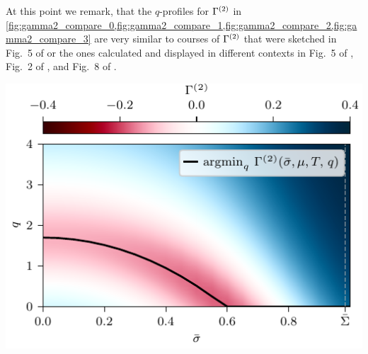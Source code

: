 At this point we remark, that the $q$-profiles for $\Gamma^{(2)}$ in \cref{fig:gamma2_compare_0,fig:gamma2_compare_1,fig:gamma2_compare_2,fig:gamma2_compare_3} are very similar to courses of $\Gamma^{(2)}$ that were sketched in Fig.~5 of  or the ones calculated and displayed in different contexts in Fig.~5 of , Fig.~2 of , and Fig.~8 of .\bigskip

	{\fullWidthTwoColumnFigureSpacing}
	{%
		\includegraphics[width=\subcaptionFigureWidth]{gn/figures/gamma2_q_sigma.pdf} %
		\captionsetup{width=\subcaptionFigureWidth}%
		\caption{%
			The bosonic two-point function $\gtwovar{\shom}{\mu}{T}{q}$ in the $\shom$-$q$-plane for the point ${( \mu, T )/\snull = ( 0.67, 0.1 )}$ in the phase diagram.
			The solid black line marks the non-trivial minima.
		}%
		\label{fig:gamma2_sigma_q}
	}%
